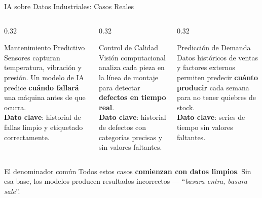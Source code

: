 \documentclass[aspectratio=169]{beamer}
\begin{document}
\begin{frame}{IA sobre Datos Industriales: Casos Reales}
  \small
  \begin{columns}[T]
    \begin{column}{0.32\textwidth}
      \begin{conceptbox}{\faCogs\enspace Mantenimiento Predictivo}
        \small
        Sensores capturan temperatura, vibración y presión. Un modelo de IA predice \textbf{cuándo fallará} una máquina antes de que ocurra.\\[4pt]
        \textbf{Dato clave}: historial de fallas limpio y etiquetado correctamente.
      \end{conceptbox}
    \end{column}
    \begin{column}{0.32\textwidth}
      \begin{conceptbox}{\faCheckCircle\enspace Control de Calidad}
        \small
        Visión computacional analiza cada pieza en la línea de montaje para detectar \textbf{defectos en tiempo real}.\\[4pt]
        \textbf{Dato clave}: historial de defectos con categorías precisas y sin valores faltantes.
      \end{conceptbox}
    \end{column}
    \begin{column}{0.32\textwidth}
      \begin{conceptbox}{\faBoxes\enspace Predicción de Demanda}
        \small
        Datos históricos de ventas y factores externos permiten predecir \textbf{cuánto producir} cada semana para no tener quiebres de stock.\\[4pt]
        \textbf{Dato clave}: series de tiempo sin valores faltantes.
      \end{conceptbox}
    \end{column}
  \end{columns}
  \vspace{0.25cm}
  \begin{alertblock}{\faExclamationTriangle\enspace El denominador común}
    \centering\small
    Todos estos casos \textbf{comienzan con datos limpios}. Sin esa base, los modelos producen resultados incorrectos --- ``\textit{basura entra, basura sale}''.
  \end{alertblock}
\end{frame}
\end{document}
